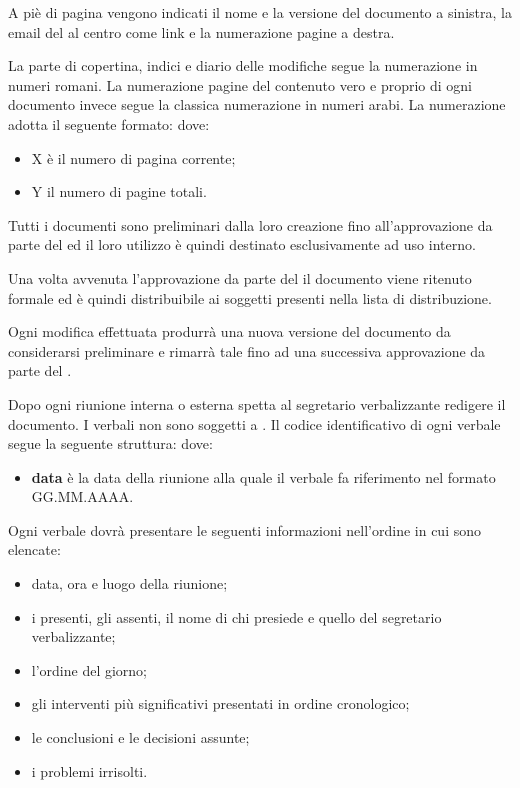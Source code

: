 \documentclass[a4paper, titlepage]{article}
\begin{document}
A piè di pagina vengono indicati il nome e la versione del documento a sinistra, la email del  al centro come link e la numerazione pagine a destra.

La parte di copertina, indici e diario delle modifiche segue la numerazione in numeri romani.
La numerazione pagine del contenuto vero e proprio di ogni documento invece segue la classica numerazione in numeri arabi.
La numerazione adotta il seguente formato:
dove:
\begin{itemize}
	\item X è il numero di pagina corrente;
	\item Y il numero di pagine totali.
\end{itemize}



Tutti i documenti sono preliminari dalla loro creazione fino all'approvazione da parte del  ed il loro utilizzo è quindi destinato esclusivamente ad uso interno.

Una volta avvenuta l'approvazione da parte del  il documento viene ritenuto formale ed è quindi distribuibile ai soggetti presenti nella lista di distribuzione.

Ogni modifica effettuata produrrà una nuova versione del documento da considerarsi preliminare e rimarrà tale fino ad una successiva approvazione da parte del .

\GLOSSARIO

Dopo ogni riunione interna o esterna spetta al segretario verbalizzante redigere il documento. I verbali non sono soggetti a . Il codice identificativo di ogni verbale segue la seguente struttura: 
dove:
\begin{itemize}
	\item \textbf{data} è la data della riunione alla quale il verbale fa riferimento nel formato GG.MM.AAAA.
\end{itemize}

Ogni verbale dovrà presentare le seguenti informazioni nell'ordine in cui sono elencate:
\begin{itemize}
	\item data, ora e luogo della riunione;
	\item i presenti, gli assenti, il nome di chi presiede e quello del segretario verbalizzante;
	\item l'ordine del giorno;
	\item gli interventi più significativi presentati in ordine cronologico;
	\item le conclusioni e le decisioni assunte;
	\item i problemi irrisolti.
\end{itemize}
\end{document}
